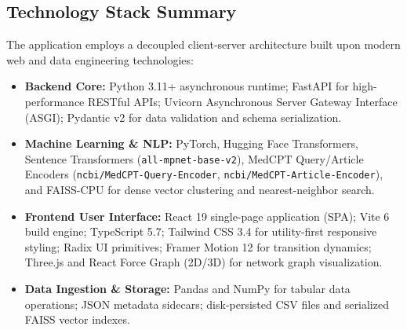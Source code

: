 \subsection{Technology Stack Summary}
The application employs a decoupled client-server architecture built upon modern web and data engineering technologies:

\begin{itemize}
    \item \textbf{Backend Core:} Python 3.11+ asynchronous runtime; FastAPI \cite{fastapi2020} for high-performance RESTful APIs; Uvicorn Asynchronous Server Gateway Interface (ASGI); Pydantic v2 for data validation and schema serialization.
    \item \textbf{Machine Learning \& NLP:} PyTorch, Hugging Face Transformers, Sentence Transformers (\texttt{all-mpnet-base-v2}), MedCPT Query/Article Encoders (\texttt{ncbi/MedCPT-Query-Encoder}, \texttt{ncbi/MedCPT-Article-Encoder}), and FAISS-CPU for dense vector clustering and nearest-neighbor search.
    \item \textbf{Frontend User Interface:} React 19 single-page application (SPA); Vite 6 build engine; TypeScript 5.7; Tailwind CSS 3.4 for utility-first responsive styling; Radix UI primitives; Framer Motion 12 for transition dynamics; Three.js and React Force Graph (2D/3D) for network graph visualization.
    \item \textbf{Data Ingestion \& Storage:} Pandas and NumPy for tabular data operations; JSON metadata sidecars; disk-persisted CSV files and serialized FAISS vector indexes.
\end{itemize}
